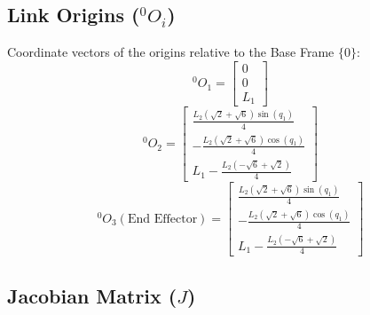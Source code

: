 \documentclass[11pt, a4paper]{article}
\begin{document}
\subsection*{Link Origins (${^0O_i}$)}
Coordinate vectors of the origins relative to the Base Frame $\{0\}$:
\vspace{0.5cm}
\begin{dmath*} {^0O_1} = \left[\begin{matrix}0\\0\\L_{1}\end{matrix}\right]\end{dmath*}
\begin{dmath*} {^0O_2} = \left[\begin{matrix}\frac{L_{2} \left(\sqrt{2} + \sqrt{6}\right) \sin{\left(q_{1} \right)}}{4}\\- \frac{L_{2} \left(\sqrt{2} + \sqrt{6}\right) \cos{\left(q_{1} \right)}}{4}\\L_{1} - \frac{L_{2} \left(- \sqrt{6} + \sqrt{2}\right)}{4}\end{matrix}\right]\end{dmath*}
\begin{dmath*} {^0O_3} (\text{End Effector}) = \left[\begin{matrix}\frac{L_{2} \left(\sqrt{2} + \sqrt{6}\right) \sin{\left(q_{1} \right)}}{4}\\- \frac{L_{2} \left(\sqrt{2} + \sqrt{6}\right) \cos{\left(q_{1} \right)}}{4}\\L_{1} - \frac{L_{2} \left(- \sqrt{6} + \sqrt{2}\right)}{4}\end{matrix}\right]\end{dmath*}
\subsection*{Jacobian Matrix ($J$)}
\vspace{0.5cm}
\noindent{}
\end{document}
